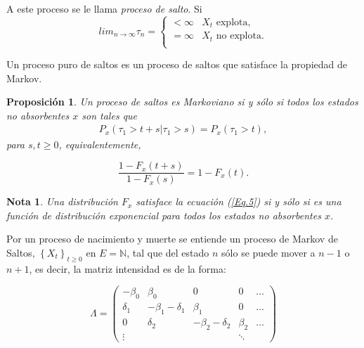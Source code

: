 \documentclass{article}
\newtheorem{Note}{Nota}[section]
\newtheorem{Prop}{Proposición}[section]
\newcommand{\nat}{\mathbb{N}}
\numberwithin{equation}{section}
\begin{document}
A este proceso  se le llama {\em proceso de salto}. Si
\begin{equation}
lim_{n\rightarrow\infty}\tau_{n}=\left\{\begin{array}{cc}
<\infty & X_{t}\textrm{ explota,}\\
=\infty & X_{t}\textrm{ no explota.}\\
\end{array}\right.
\end{equation}

Un proceso puro de saltos es un proceso de saltos que satisface la propiedad de Markov.

\begin{Prop}
Un proceso de saltos es Markoviano si y s\'olo si todos los estados no absorbentes $x$ son tales que
\begin{eqnarray*}
P_{x}\left(\tau_{1}>t+s|\tau_{1}>s\right)=P_{x}\left(\tau_{1}>t\right),
\end{eqnarray*}
para $s,t\geq0$, equivalentemente,

\begin{equation}\label{Eq.5}
\frac{1-F_{x}\left(t+s\right)}{1-F_{x}\left(s\right)}=1-F_{x}\left(t\right).
\end{equation}
\end{Prop}

\begin{Note}
Una distribuci\'on $F_{x}$ satisface la ecuaci\'on (\ref{Eq.5}) si y s\'olo si es una funci\'on de distribuci\'on exponencial para todos los estados no absorbentes $x$.
\end{Note}

Por un proceso de nacimiento y muerte  se entiende un proceso de Markov de Saltos, $\left\{X_{t}\right\}_{t\geq0}$ en $E=\nat$, tal que del estado $n$ s\'olo se puede mover a $n-1$ o $n+1$, es decir, la matriz intensidad es de la forma:

\begin{equation}
\Lambda=\left(\begin{array}{ccccc}
-\beta_{0}&\beta_{0} & 0 & 0 & \ldots\\
\delta_{1}&-\beta_{1}-\delta_{1} & \beta_{1}&0&\ldots\\
0&\delta_{2}&-\beta_{2}-\delta_{2} & \beta_{2}&\ldots\\
\vdots & & & \ddots &
\end{array}\right)
\end{equation}
\end{document}
